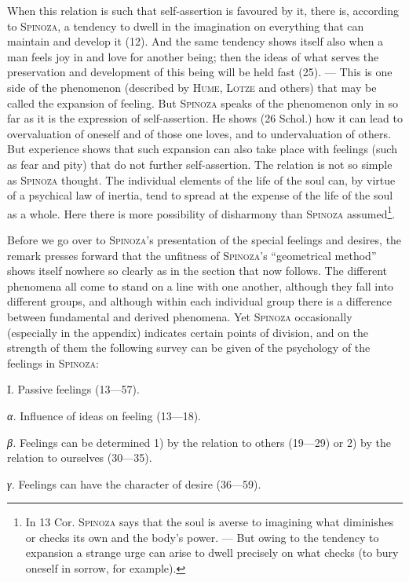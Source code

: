 \documentclass[12pt]{article}
\newcommand{\opage}[1]{\marginnote{\footnotesize\textit{[#1]}}}
\begin{document}
When this relation is such that self-assertion is favoured by it, there is, according to
\textsc{Spinoza}, a tendency to dwell in the imagination on everything that can maintain and
develop it (12). And the same tendency shows itself also when a man feels joy in and love for
another being; then the ideas of what serves the preservation and development of this being will
be held fast (25). --- This is one side of the phenomenon (described by \textsc{Hume},
\textsc{Lotze} and others) that may be called the expansion of feeling. But \textsc{Spinoza}
speaks of the phenomenon only in so far as it is the expression of self-assertion. He shows (26
Schol.) how it can lead to overvaluation of oneself and of those one loves, and to undervaluation
of others. But experience shows that such expansion can also take place with feelings (such as
fear and pity) that do not further self-assertion. The relation is not so simple as
\textsc{Spinoza} thought. The individual elements of the life of the soul can, by virtue of a
psychical law of inertia, tend to spread at the expense of the life of the soul as a whole. Here
there is more possibility of disharmony than \textsc{Spinoza} assumed\footnote{In 13 Cor.
\textsc{Spinoza} says that the soul is averse to imagining what diminishes or checks its own and
the body's power. --- But owing to the tendency to expansion a strange urge can arise to dwell
precisely on what checks (to bury oneself in sorrow, for example).}.

Before we go over to \textsc{Spinoza}'s presentation of the special feelings and desires, the
remark presses forward that the unfitness of \textsc{Spinoza}'s ``geometrical method'' shows
itself nowhere so clearly as in the section that now follows. The different phenomena all come to
stand on a line with one another, although they fall into different groups, and although within
each individual group there is a difference between fundamental and derived phenomena. Yet
\textsc{Spinoza} occasionally (especially in the appendix) indicates certain points of division,
and on the strength of them the following survey can be given of the psychology of the feelings
in \textsc{Spinoza}:

\opage{65}I. Passive feelings (13---57).

\textit{α.} Influence of ideas on feeling (13---18).

\textit{β.} Feelings can be determined 1) by the relation to others (19---29) or 2) by the
relation to ourselves (30---35).

\textit{γ.} Feelings can have the character of desire (36---59).
\end{document}
